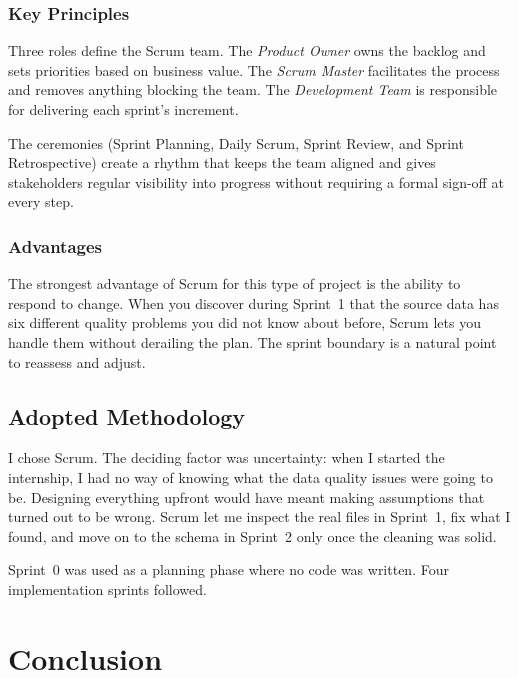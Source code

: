 \documentclass[12pt, a4paper]{report}
\begin{document}

\subsubsection{Key Principles}

Three roles define the Scrum team. The \textit{Product Owner} owns the backlog and
sets priorities based on business value. The \textit{Scrum Master} facilitates the
process and removes anything blocking the team. The \textit{Development Team} is
responsible for delivering each sprint's increment.

The ceremonies (Sprint Planning, Daily Scrum, Sprint Review, and Sprint
Retrospective) create a rhythm that keeps the team aligned and gives stakeholders
regular visibility into progress without requiring a formal sign-off at every step.

\subsubsection{Advantages}

The strongest advantage of Scrum for this type of project is the ability to respond
to change. When you discover during Sprint~1 that the source data has six different
quality problems you did not know about before, Scrum lets you handle them without
derailing the plan. The sprint boundary is a natural point to reassess and adjust.

\subsection{Adopted Methodology}

I chose Scrum. The deciding factor was uncertainty: when I started the internship,
I had no way of knowing what the data quality issues were going to be. Designing
everything upfront would have meant making assumptions that turned out to be wrong.
Scrum let me inspect the real files in Sprint~1, fix what I found, and move on to
the schema in Sprint~2 only once the cleaning was solid.

Sprint~0 was used as a planning phase where no code was written. Four implementation
sprints followed.

\section{Conclusion}
\end{document}
